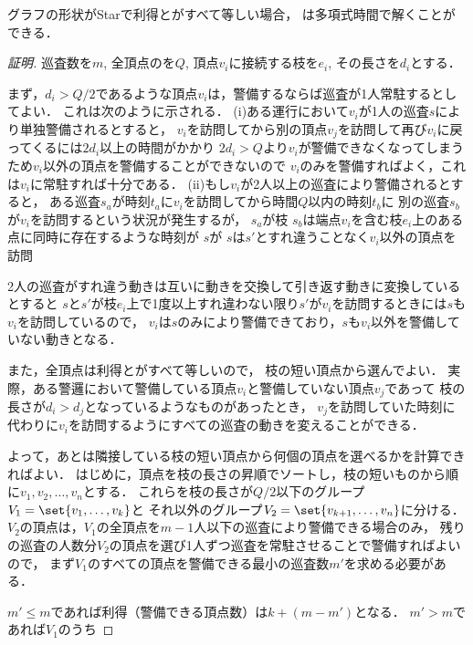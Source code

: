 \begin{theo}
	\label{theo:StarEqualProfitTimelimit}
	グラフの形状がStarで利得と{\timelimit}がすべて等しい場合，
	{\patrolling}は多項式時間で解くことができる．
\end{theo}


\begin{proof}[証明]

	巡査数を$m$, 全頂点の{\timelimit}を$Q$, 頂点$v_i$に接続する枝を$e_i$, その長さを$d_i$とする．

	まず，$d_i > Q/2$であるような頂点$v_i$は，警備するならば巡査が1人常駐するとしてよい．
	これは次のように示される．
	(i)ある運行において$v_i$が1人の巡査$s$により単独警備されるとすると，
	$v_i$を訪問してから別の頂点$v_j$を訪問して再び$v_i$に戻ってくるには$2d_i$以上の時間がかかり
	$2d_i > Q$より$v_i$が警備できなくなってしまうため$v_i$以外の頂点を警備することができないので
	$v_i$のみを警備すればよく，これは$v_i$に常駐すれば十分である．
	(ii)もし$v_i$が2人以上の巡査により警備されるとすると，
	ある巡査$s_a$が時刻$t_a$に$v_i$を訪問してから時間$Q$以内の時刻$t_b$に
	別の巡査$s_b$が$v_i$を訪問するという状況が発生するが，
	$s_a$が枝
	$s_b$は端点$v_i$を含む枝$e_i$上のある点に同時に存在するような時刻が
	$s$が
	$s$は$s'$とすれ違うことなく$v_i$以外の頂点を訪問



	2人の巡査がすれ違う動きは互いに動きを交換して引き返す動きに変換しているとすると
	$s$と$s'$が枝$e_i$上で1度以上すれ違わない限り$s'$が$v_i$を訪問するときには$s$も
	$v_i$を訪問しているので，
	$v_i$は$s$のみにより警備できており，$s$も$v_i$以外を警備していない動きとなる．


	また，全頂点は利得と{\timelimit}がすべて等しいので，
	枝の短い頂点から選んでよい．
	実際，ある警邏において警備している頂点$v_i$と警備していない頂点$v_j$であって
	枝の長さが$d_i > d_j$となっているようなものがあったとき，
	$v_j$を訪問していた時刻に代わりに$v_i$を訪問するようにすべての巡査の動きを変えることができる．


	よって，あとは隣接している枝の短い頂点から何個の頂点を選べるかを計算できればよい．
	はじめに，頂点を枝の長さの昇順でソートし，枝の短いものから順に$v_1,v_2, \ldots, v_n$とする．
	これらを枝の長さが$Q/2$以下のグループ$V_1 = \set{v_1, \ldots, v_k}$と
	それ以外のグループ$V_2 = \set{ v_{k + 1}, \ldots, v_n }$に分ける．
	$V_2$の頂点は，$V_1$の全頂点を$m - 1$人以下の巡査により警備できる場合のみ，
	残りの巡査の人数分$V_2$の頂点を選び1人ずつ巡査を常駐させることで警備すればよいので，
	まず$V_1$のすべての頂点を警備できる最小の巡査数$m'$を求める必要がある．

	$m' \leq m$であれば利得（警備できる頂点数）は$k + (m - m')$となる．
	$m' > m$であれば$V_1$のうち

\end{proof}












